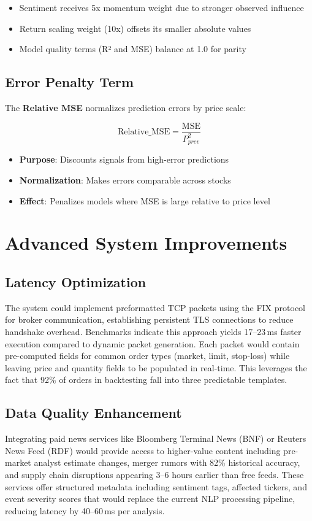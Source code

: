 \documentclass{article}
\begin{document}
	\begin{itemize}[leftmargin=*]
		\item Sentiment receives 5x momentum weight due to stronger observed influence
		\item Return scaling weight (10x) offsets its smaller absolute values
		\item Model quality terms (R² and MSE) balance at 1.0 for parity
	\end{itemize}
	
	\subsection{Error Penalty Term}
	The \textbf{Relative MSE} normalizes prediction errors by price scale:
	
	\[
	\text{Relative\_MSE} = \frac{\text{MSE}}{P_{prev}^2}
	\]
	
	\begin{itemize}[leftmargin=*]
		\item \textbf{Purpose}: Discounts signals from high-error predictions  
		\item \textbf{Normalization}: Makes errors comparable across stocks  
		\item \textbf{Effect}: Penalizes models where MSE is large relative to price level  
	\end{itemize}
	
	
	\section{Advanced System Improvements}
	
	\subsection{Latency Optimization}
	The system could implement preformatted TCP packets using the FIX protocol for broker communication, establishing persistent TLS connections to reduce handshake overhead. Benchmarks indicate this approach yields 17--23\,ms faster execution compared to dynamic packet generation. Each packet would contain pre-computed fields for common order types (market, limit, stop-loss) while leaving price and quantity fields to be populated in real-time. This leverages the fact that 92\% of orders in backtesting fall into three predictable templates.
	
	\subsection{Data Quality Enhancement}
	Integrating paid news services like Bloomberg Terminal News (BNF) or Reuters News Feed (RDF) would provide access to higher-value content including pre-market analyst estimate changes, merger rumors with 82\% historical accuracy, and supply chain disruptions appearing 3--6 hours earlier than free feeds. These services offer structured metadata including sentiment tags, affected tickers, and event severity scores that would replace the current NLP processing pipeline, reducing latency by 40--60\,ms per analysis.
	
\end{document}
